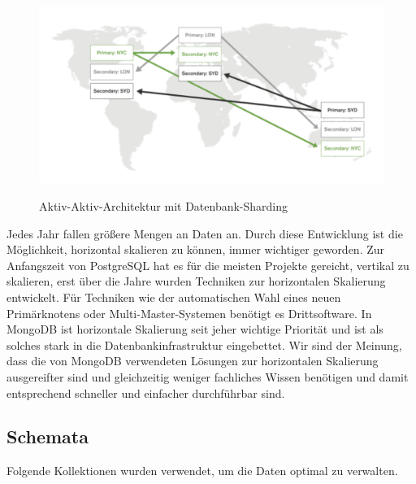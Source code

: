 \begin{figure}[ht]
	\centering
    \includegraphics[width=\textwidth]{sources/MongoDB_sharded.png}\cite{MG14}
	\caption{Aktiv-Aktiv-Architektur mit Datenbank-Sharding}
	\label{fig1}
\end{figure}

Jedes Jahr fallen größere Mengen an Daten an. Durch diese Entwicklung ist die Möglichkeit, horizontal skalieren zu können, immer wichtiger geworden. Zur Anfangszeit von PostgreSQL hat es für die meisten Projekte gereicht, vertikal zu skalieren, erst über die Jahre wurden Techniken zur horizontalen Skalierung entwickelt. Für Techniken wie der automatischen Wahl eines neuen Primärknotens oder Multi-Master-Systemen benötigt es Drittsoftware. In MongoDB ist horizontale Skalierung seit jeher wichtige Priorität und ist als solches stark in die Datenbankinfrastruktur eingebettet. Wir sind der Meinung, dass die von MongoDB verwendeten Lösungen zur horizontalen Skalierung ausgereifter sind und gleichzeitig weniger fachliches Wissen benötigen und damit entsprechend schneller und einfacher durchführbar sind.



\subsection{Schemata}
Folgende Kollektionen wurden verwendet, um die Daten optimal zu verwalten.

